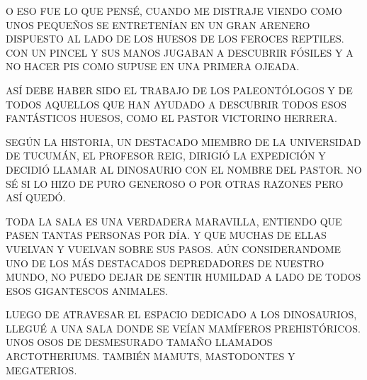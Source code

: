 O ESO FUE LO QUE PENSÉ, CUANDO ME DISTRAJE VIENDO COMO UNOS PEQUEÑOS SE ENTRETENÍAN EN UN GRAN ARENERO DISPUESTO AL LADO DE LOS HUESOS DE LOS FEROCES REPTILES. CON UN PINCEL Y SUS MANOS JUGABAN A DESCUBRIR FÓSILES Y A NO HACER PIS COMO SUPUSE EN UNA PRIMERA OJEADA. 

ASÍ DEBE HABER SIDO EL TRABAJO DE LOS PALEONTÓLOGOS Y DE TODOS AQUELLOS QUE HAN AYUDADO A DESCUBRIR TODOS ESOS FANTÁSTICOS HUESOS, COMO EL PASTOR VICTORINO HERRERA.

\newpage
{}
 SEGÚN LA HISTORIA, UN DESTACADO MIEMBRO DE LA UNIVERSIDAD DE TUCUMÁN, EL PROFESOR REIG, DIRIGIÓ LA EXPEDICIÓN Y DECIDIÓ LLAMAR AL DINOSAURIO CON EL NOMBRE DEL PASTOR. NO SÉ SI LO HIZO DE PURO GENEROSO O POR OTRAS RAZONES PERO ASÍ QUEDÓ.
 
 TODA LA SALA ES UNA VERDADERA MARAVILLA, ENTIENDO QUE PASEN TANTAS PERSONAS POR DÍA. Y QUE MUCHAS DE ELLAS VUELVAN Y VUELVAN SOBRE SUS PASOS. AÚN CONSIDERANDOME UNO DE LOS MÁS DESTACADOS DEPREDADORES DE NUESTRO MUNDO, NO PUEDO DEJAR DE SENTIR HUMILDAD A LADO DE TODOS ESOS GIGANTESCOS ANIMALES.
 
 LUEGO DE ATRAVESAR EL ESPACIO DEDICADO A LOS DINOSAURIOS, LLEGUÉ A UNA SALA DONDE SE VEÍAN MAMÍFEROS PREHISTÓRICOS. UNOS OSOS DE DESMESURADO TAMAÑO LLAMADOS ARCTOTHERIUMS. TAMBIÉN MAMUTS, MASTODONTES Y MEGATERIOS.
 
  

